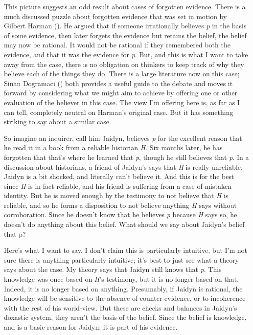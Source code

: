 \documentclass[
  12pt,
  letterpaper,
]{scrbook}
\begin{document}
This picture suggests an odd result about cases of forgotten evidence.
There is a much discussed puzzle about forgotten evidence that was set
in motion by Gilbert Harman (). He argued
that if someone irrationally believes \emph{p} in the basis of some
evidence, then later forgets the evidence but retains the belief, the
belief may now be rational. It would not be rational if they remembered
both the evidence, and that it was the evidence for \emph{p}. But, and
this is what I want to take away from the case, there is no obligation
on thinkers to keep track of why they believe each of the things they
do. There is a large literature now on this case; Sinan Dogramaci
() both provides a useful guide to the
debate and moves it forward by considering what we might aim to achieve
by offering one or other evaluation of the believer in this case. The
view I'm offering here is, as far as I can tell, completely neutral on
Harman's original case. But it has something striking to say about a
similar case.

So imagine an inquirer, call him Jaidyn, believes \emph{p} for the
excellent reason that he read it in a book from a reliable historian
\emph{H}. Six months later, he has forgotten that that's where he
learned that \emph{p}, though he still believes that \emph{p}. In a
discussion about historians, a friend of Jaidyn's says that \emph{H} is
really unreliable. Jaidyn is a bit shocked, and literally can't believe
it. And this is for the best since \emph{H} is in fact reliable, and his
friend is suffering from a case of mistaken identity. But he is moved
enough by the testimony to not believe that \emph{H} is reliable, and so
he forms a disposition to not believe anything \emph{H} says without
corroboration. Since he doesn't know that he believes \emph{p} because
\emph{H} says so, he doesn't do anything about this belief. What should
we say about Jaidyn's belief that p?

Here's what I want to say. I don't claim this is particularly intuitive,
but I'm not sure there is anything particularly intuitive; it's best to
just see what a theory says about the case. My theory says that Jaidyn
still knows that \emph{p}. This knowledge was once based on \emph{H}'s
testimony, but it is no longer based on that. Indeed, it is no longer
based on anything. Presumably, if Jaidyn is rational, the knowledge will
be sensitive to the absence of counter-evidence, or to incoherence with
the rest of his world-view. But these are checks and balances in
Jaidyn's doxastic system, they aren't the basis of the belief. Since the
belief is knowledge, and is a basic reason for Jaidyn, it is part of his
evidence.
\end{document}
